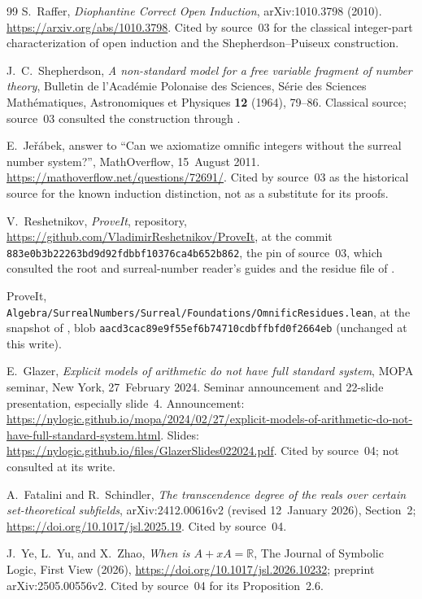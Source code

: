 \documentclass[11pt]{article}
\theoremstyle{definition}
\theoremstyle{remark}
\newcommand{\fn}[1]{\nolinkurl{#1}}
\begin{document}
\begin{thebibliography}{99}
S.~Raffer, \emph{Diophantine Correct Open Induction},
arXiv:1010.3798 (2010). \url{https://arxiv.org/abs/1010.3798}.
Cited by source~03 for the classical integer-part characterization of
open induction and the Shepherdson--Puiseux construction.

J.~C.~Shepherdson, \emph{A non-standard model for a free variable
fragment of number theory}, Bulletin de l'Acad\'emie Polonaise des
Sciences, S\'erie des Sciences Math\'ematiques, Astronomiques et
Physiques \textbf{12} (1964), 79--86.
Classical source; source~03 consulted the construction through
\cite{Raffer}.

E.~Je\v r\'abek, answer to ``Can we axiomatize omnific integers without
the surreal number system?'', MathOverflow, 15~August 2011.
\url{https://mathoverflow.net/questions/72691/}.
Cited by source~03 as the historical source for the known induction
distinction, not as a substitute for its proofs.

V.~Reshetnikov, \emph{ProveIt}, repository,
\url{https://github.com/VladimirReshetnikov/ProveIt}, at the commit
\texttt{883e0b3b22263bd9d92fdbbf10376ca4b652b862}, the pin of source~03, which consulted the root and surreal-number
reader's guides and the residue file of \cite{Residues}.

ProveIt, \fn{Algebra/SurrealNumbers/Surreal/Foundations/OmnificResidues.lean},
at the snapshot of \cite{ProveIt}, blob
\texttt{aacd3cac89e9f55ef6b74710cdbffbfd0f2664eb} (unchanged at this
write).
\begingroup\raggedright E.~Glazer, \emph{Explicit models of arithmetic do not have full standard
system}, MOPA seminar, New York, 27~February 2024. Seminar announcement and
22-slide presentation, especially slide~4. Announcement:
\url{https://nylogic.github.io/mopa/2024/02/27/explicit-models-of-arithmetic-do-not-have-full-standard-system.html}.
Slides: \url{https://nylogic.github.io/files/GlazerSlides022024.pdf}.
Cited by source~04; not consulted at its write.\par\endgroup

A.~Fatalini and R.~Schindler, \emph{The transcendence degree of the reals
over certain set-theoretical subfields}, arXiv:2412.00616v2 (revised
12~January 2026), Section~2; \url{https://doi.org/10.1017/jsl.2025.19}.
Cited by source~04.

J.~Ye, L.~Yu, and X.~Zhao, \emph{When is $A+xA=\mathbb R$}, The Journal of
Symbolic Logic, First View (2026), \url{https://doi.org/10.1017/jsl.2026.10232};
preprint arXiv:2505.00556v2. Cited by source~04 for its Proposition~2.6.


\end{thebibliography}
\end{document}
